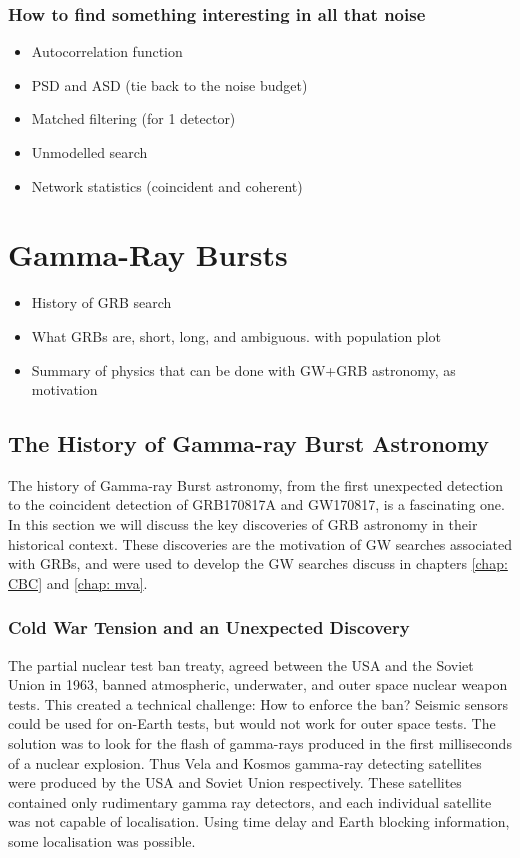 \documentclass[11pt]{cuthesis}
\begin{document}
\subsection{How to find something interesting in all that noise}
\begin{itemize}
\item Autocorrelation function
\item PSD and ASD (tie back to the noise budget) 
\item Matched filtering (for 1 detector)
\item Unmodelled search
\item Network statistics (coincident and coherent) 
\end{itemize}

\chapter{Gamma-Ray Bursts} \label{chap:GRBs}
\begin{itemize}
\item History of GRB search
\item What GRBs are, short, long, and ambiguous. with population plot
\item Summary of physics that can be done with GW+GRB astronomy, as motivation
\end{itemize}

\section{The History of Gamma-ray Burst Astronomy} \label{sec:GRB history}
The history of Gamma-ray Burst astronomy, from the first unexpected detection to the coincident detection of GRB170817A and GW170817, is a fascinating one. In this section we will discuss the key discoveries of GRB astronomy in their historical context. These discoveries are the motivation of GW searches associated with GRBs, and were used to develop the GW searches discuss in chapters \ref{chap: CBC} and \ref{chap: mva}.  

\subsection{Cold War Tension and an Unexpected Discovery} \label{sec:cold war}
The partial nuclear test ban treaty, agreed between the USA and the Soviet Union in 1963, banned atmospheric, underwater, and outer space nuclear weapon tests. This created a technical challenge: How to enforce the ban? Seismic sensors could be used for on-Earth tests, but would not work for outer space tests. The solution was to look for the flash of gamma-rays produced in the first milliseconds of a nuclear explosion. Thus Vela and Kosmos gamma-ray detecting satellites were produced by the USA and Soviet Union respectively. These satellites contained only rudimentary gamma ray detectors, and each individual satellite was not capable of localisation. Using time delay and Earth blocking information, some localisation was possible. 
\end{document}
